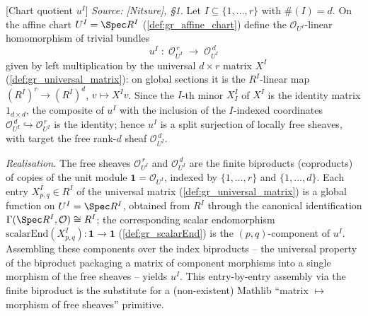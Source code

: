 \begin{definition}

[Chart quotient \(u^I\)]
  \label{def:gr_chart_quotient}
  \textit{Source: [Nitsure], \S 1.}
  Let \(I \subseteq \{1,\dots,r\}\) with \(\#(I) = d\). On the affine chart
  \(U^I = \Spec R^I\) (\cref{def:gr_affine_chart}) define the
  \(\mathcal{O}_{U^I}\)-linear homomorphism of trivial bundles
  \[
    u^I \;:\; \mathcal{O}_{U^I}^{\,r}
      \;\longrightarrow\; \mathcal{O}_{U^I}^{\,d}
  \]
  given by left multiplication by the universal \(d \times r\) matrix \(X^I\)
  (\cref{def:gr_universal_matrix}): on global sections it is the \(R^I\)-linear
  map \((R^I)^{r} \to (R^I)^{d}\), \(v \mapsto X^I v\). Since the \(I\)-th minor
  \(X^I_I\) of \(X^I\) is the identity matrix \(1_{d \times d}\), the composite of
  \(u^I\) with the inclusion of the \(I\)-indexed coordinates
  \(\mathcal{O}_{U^I}^{\,d} \hookrightarrow \mathcal{O}_{U^I}^{\,r}\) is the
  identity; hence \(u^I\) is a split surjection of locally free sheaves, with
  target the free rank-\(d\) sheaf \(\mathcal{O}_{U^I}^{\,d}\).

  \emph{Realisation.} The free sheaves \(\mathcal{O}_{U^I}^{\,r}\) and
  \(\mathcal{O}_{U^I}^{\,d}\) are the finite biproducts (coproducts) of copies of
  the unit module \(\mathbf{1} = \mathcal{O}_{U^I}\), indexed by \(\{1,\dots,r\}\)
  and \(\{1,\dots,d\}\). Each entry \(X^I_{p,q} \in R^I\) of the universal matrix
  (\cref{def:gr_universal_matrix}) is a global function on \(U^I = \Spec R^I\),
  obtained from \(R^I\) through the canonical identification
  \(\Gamma(\Spec R^I, \mathcal{O}) \cong R^I\); the corresponding scalar
  endomorphism \(\mathrm{scalarEnd}(X^I_{p,q}) : \mathbf{1} \to \mathbf{1}\)
  (\cref{def:gr_scalarEnd}) is the \((p,q)\)-component of \(u^I\). Assembling these
  components over the index biproducts -- the universal property of the biproduct
  packaging a matrix of component morphisms into a single morphism of the free
  sheaves -- yields \(u^I\). This entry-by-entry assembly via the finite biproduct
  is the substitute for a (non-existent) Mathlib ``matrix \(\mapsto\) morphism of
  free sheaves'' primitive.
\end{definition}



